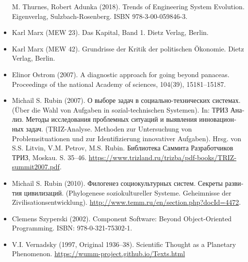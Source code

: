 \documentclass[11pt,a4paper]{article}
\begin{document}
\begin{itemize}
  M. Thurnes, Robert Adunka (2018). Trends of Engineering System
  Evolution. Eigenverlag, Sulzbach-Rosenberg.  ISBN 978-3-00-059846-3.
\item Karl Marx (MEW 23). Das Kapital, Band 1. Dietz Verlag, Berlin.
\item Karl Marx (MEW 42). Grundrisse der Kritik der politischen Ökonomie.
  Dietz Verlag, Berlin.
\item Elinor Ostrom (2007). A diagnostic approach for going beyond panaceas.
  Proceedings of the national Academy of sciences, 104(39), 15181--15187.
\item Michail S. Rubin (2007). \foreignlanguage{russian}{О выборе задач в
  социально-технических системах}. (Über die Wahl von Aufgaben in
  sozial-technischen Systemen). In: \foreignlanguage{russian}{ТРИЗ Анализ.
    Методы исследования проблемных ситуаций и выявления инновационных
    задач}. (TRIZ-Analyse. Methoden zur Untersuchung von Problemsituationen
  und zur Identifizierung innovativer Aufgaben). Hrsg. von S.S. Litvin,
  V.M. Petrov, M.S. Rubin. \foreignlanguage{russian}{Библиотека Саммита
    Разработчиков ТРИЗ}, Moskau. S. 35--46.
  \url{https://www.trizland.ru/trizba/pdf-books/TRIZ-summit2007.pdf}.
\item Michail S. Rubin (2010). \foreignlanguage{russian}{Филогенез
  социокультурных систем. Секреты развития цивилизаций}.  (Phylogenese
  soziokultureller Systeme. Geheimnisse der Zivilisationsentwicklung).
  \url{http://www.temm.ru/en/section.php?docId=4472}.
\item Clemens Szyperski (2002). Component Software: Beyond Object-Oriented
  Programming. ISBN: 978-0-321-75302-1.
\item V.I. Vernadsky (1997, Original 1936--38). Scientific Thought as a
  Planetary Phenomenon. \url{https://wumm-project.github.io/Texts.html}
\end{itemize}
\end{document}
